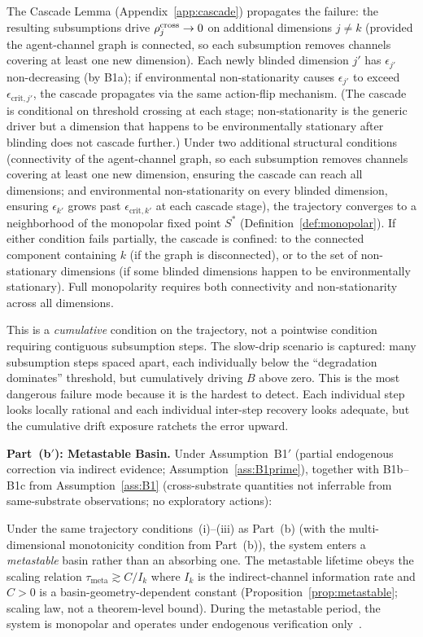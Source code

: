 \begin{theorem}
The Cascade Lemma (Appendix~\ref{app:cascade}) propagates the failure:
the resulting subsumptions drive $\rho^{\mathrm{cross}}_j \to 0$ on additional
dimensions $j \neq k$ (provided the agent-channel graph is
connected, so each subsumption removes channels covering at least one
new dimension).  Each newly blinded dimension $j'$ has
$\epsilon_{j'}$ non-decreasing (by B1a); if environmental
non-stationarity causes $\epsilon_{j'}$ to exceed
$\epsilon_{\mathrm{crit},j'}$, the cascade propagates via the same
action-flip mechanism.  (The cascade is conditional on threshold
crossing at each stage; non-stationarity is the generic driver but
a dimension that happens to be environmentally stationary after
blinding does not cascade further.)
Under two additional structural conditions (connectivity of the
agent-channel graph, so each subsumption removes channels covering at
least one new dimension, ensuring the cascade can reach all
dimensions; and environmental non-stationarity on every blinded
dimension, ensuring $\epsilon_{k'}$ grows past $\epsilon_{\mathrm{crit},k'}$
at each cascade stage), the trajectory converges to a neighborhood
of the monopolar fixed point $S^*$ (Definition~\ref{def:monopolar}).
If either condition fails partially, the cascade is confined: to
the connected component containing $k$ (if the graph is disconnected),
or to the set of non-stationary dimensions (if some blinded dimensions
happen to be environmentally stationary).  Full monopolarity requires
both connectivity and non-stationarity across all dimensions.

This is a \emph{cumulative} condition on the trajectory, not a
pointwise condition requiring contiguous subsumption steps.  The
slow-drip scenario is captured: many subsumption steps spaced apart,
each individually below the ``degradation dominates'' threshold, but
cumulatively driving $B$ above zero.  This is the most dangerous
failure mode because it is the hardest to detect.  Each individual
step looks locally rational and each individual inter-step recovery
looks adequate, but the cumulative drift exposure ratchets the error
upward.

\medskip
\noindent\textbf{Part~(b$'$): Metastable Basin.}
Under Assumption~B1$'$ (partial endogenous correction via indirect
evidence; Assumption~\ref{ass:B1prime}), together with B1b--B1c from
Assumption~\ref{ass:B1} (cross-substrate quantities not inferrable from
same-substrate observations; no exploratory actions):

Under the same trajectory conditions~(i)--(iii) as Part~(b) (with the
multi-dimensional monotonicity condition from Part~(b)), the system
enters a \emph{metastable} basin rather than an absorbing one.  The
metastable lifetime obeys the scaling relation $\tau_{\mathrm{meta}}
\gtrsim C/I_k$ where $I_k$ is the indirect-channel information rate
and $C > 0$ is a basin-geometry-dependent constant
(Proposition~\ref{prop:metastable}; scaling law, not a theorem-level
bound).  During the metastable period, the system is monopolar and
operates under endogenous verification only~\citep{lasser2026exo}.


\end{theorem}
